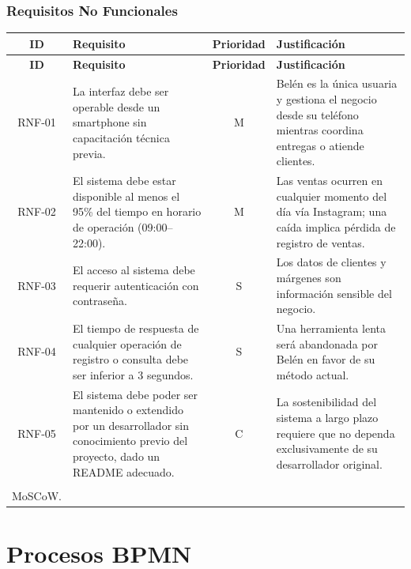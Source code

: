 \documentclass[11pt,letterpaper]{article}
\begin{document}
\newpage
\subsubsection*{Requisitos No Funcionales}

\begin{longtable}{|c|p{6.5cm}|c|p{5.5cm}|}
\hline
\textbf{ID} & \textbf{Requisito} & \textbf{Prioridad} & \textbf{Justificación} \\
\hline
\endfirsthead

\hline
\textbf{ID} & \textbf{Requisito} & \textbf{Prioridad} & \textbf{Justificación} \\
\hline
\endhead

\hline
\endfoot

\endlastfoot

RNF-01 & La interfaz debe ser operable desde un smartphone sin capacitación técnica previa. & M & Belén es la única usuaria y gestiona el negocio desde su teléfono mientras coordina entregas o atiende clientes. \\
\hline
RNF-02 & El sistema debe estar disponible al menos el 95\% del tiempo en horario de operación (09:00--22:00). & M & Las ventas ocurren en cualquier momento del día vía Instagram; una caída implica pérdida de registro de ventas. \\
\hline
RNF-03 & El acceso al sistema debe requerir autenticación con contraseña. & S & Los datos de clientes y márgenes son información sensible del negocio. \\
\hline
RNF-04 & El tiempo de respuesta de cualquier operación de registro o consulta debe ser inferior a 3 segundos. & S & Una herramienta lenta será abandonada por Belén en favor de su método actual. \\
\hline
RNF-05 & El sistema debe poder ser mantenido o extendido por un desarrollador sin conocimiento previo del proyecto, dado un README adecuado. & C & La sostenibilidad del sistema a largo plazo requiere que no dependa exclusivamente de su desarrollador original. \\
\hline
\caption{Requisitos no funcionales priorizados según \\ MoSCoW.}
\label{tab:rnf}
\end{longtable}

\newpage

\section{Procesos BPMN}
\end{document}
